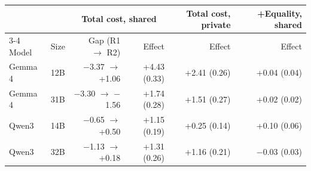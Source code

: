 \begin{tabular}{llrrrr}
\toprule
 & & \multicolumn{2}{c}{Total cost, shared} & Total cost, private & +Equality, shared \\
\cmidrule(lr){3-4}
Model & Size & Gap (R1 $\rightarrow$ R2) & Effect & Effect & Effect \\
\midrule
Gemma 4 & 12B & $-$3.37 $\rightarrow$ +1.06 & +4.43 (0.33) & +2.41 (0.26) & +0.04 (0.04) \\
Gemma 4 & 31B & $-$3.30 $\rightarrow$ $-$1.56 & +1.74 (0.28) & +1.51 (0.27) & +0.02 (0.02) \\
Qwen3 & 14B & $-$0.65 $\rightarrow$ +0.50 & +1.15 (0.19) & +0.25 (0.14) & +0.10 (0.06) \\
Qwen3 & 32B & $-$1.13 $\rightarrow$ +0.18 & +1.31 (0.26) & +1.16 (0.21) & $-$0.03 (0.03) \\
\bottomrule
\end{tabular}
